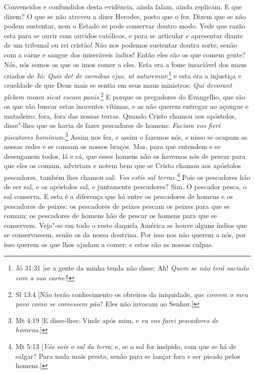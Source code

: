 Convencidos e confundidos desta evidência, ainda falam, ainda replicam.
E que dizem? O que se não atreveu a dizer Herodes, posto que o fez.
Dizem que se não podem sustentar, nem o Estado se pode conservar doutro
modo. Vede que razão esta para se ouvir com ouvidos católicos, e para se
articular e apresentar diante de um tribunal ou rei cristão! Não nos
podemos sustentar doutra sorte, senão com a carne e sangue dos
miseráveis índios! Então eles são os que comem gente? Nós, nós somos os
que os imos comer a eles. Esta era a fome insaciável dos maus criados de
Jó: \emph{Quis det de carnibus ejus, ut saturemur}:\footnote{Jó 31:31 [se a gente da minha tenda não disse: Ah! \emph{Quem se não terá saciado com a sua carne!}]} e esta era a
injustiça e crueldade de que Deus mais se sentia em seus maus ministros:
\emph{Qui devorant plebem meam sicut escam panis}.\footnote{Sl 13:4 [Não terão conhecimento os obreiros da iniquidade, \emph{que comem o meu povo como se
comessem pão}? Eles não invocam ao Senhor.]} E porque
os pregadores do Evangelho, que são os que vão buscar estas inocentes
vítimas, e as não querem entregar ao açougue e matadeiro: fora, fora das
nossas terras. Quando Cristo chamou aos apóstolos, disse"-lhes que os
havia de fazer pescadores de homens: \emph{Faciam vos fieri piscatores
hominum}.\footnote{Mt 4:19 [E disse-lhes: Vinde após mim, e \emph{eu vos farei pescadores de homens}.]} Assim nos fez, e assim o fazemos nós, e nisso se
ocupam as nossas redes e se cansam os nossos braços. Mas, para que
entendem e se desenganem todos, lá e cá, que esses homens não os havemos
nós de pescar para que eles os comam, advirtam e notem bem que se Cristo
chamou aos apóstolos pescadores, também lhes chamou sal: \emph{Vos estis
sal terrae}.\footnote{Mt 5:13 [\emph{Vós sois o sal da terra}; e, se o sal for insípido, com que se há de salgar? Para nada mais presta, senão para se lançar fora e ser pisado pelos homens.]} Pois os pescadores hão de ser sal, e os
apóstolos sal, e juntamente pescadores? Sim. O pescador pesca, o sal
conserva. E esta é a diferença que há entre os pescadores de homens e os
pescadores de peixes: os pescadores de peixes pescam os peixes para que
se comam; os pescadores de homens hão de pescar os homens para que se
conservem. Veja"-se em todo o resto daquela América se houve alguns
índios que se conservassem, senão os da nossa doutrina. Por isso nos não
querem a nós, por isso querem os que lhos ajudam a comer: e estas são as
nossas culpas.


